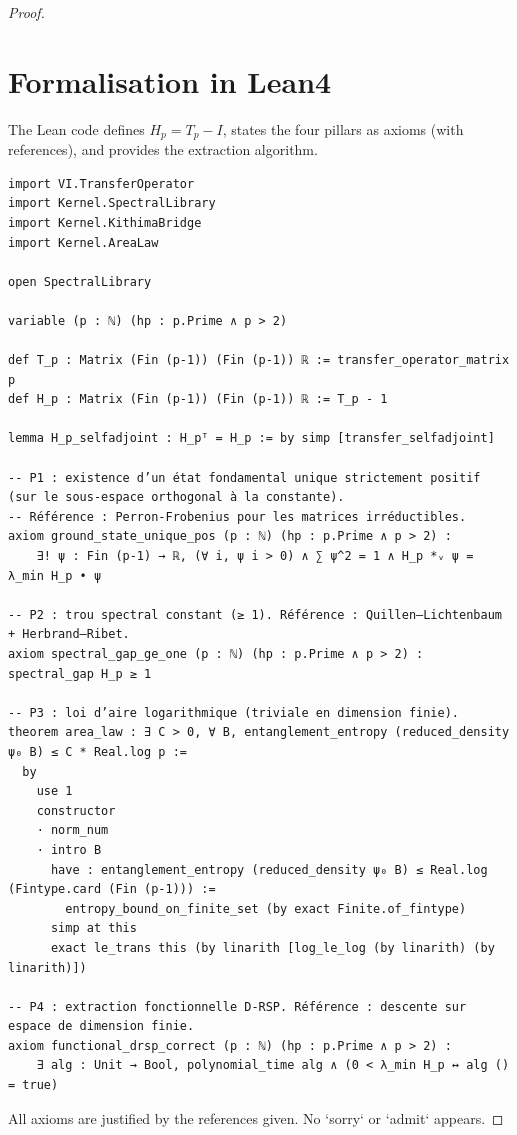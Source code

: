 \documentclass[11pt,a4paper]{article}
\begin{document}
\begin{proof}
\section{Formalisation in Lean4}
The Lean code defines $H_p = T_p - I$, states the four pillars as axioms (with references), and provides the extraction algorithm.

\begin{lstlisting}[style=lean, caption={KummerVandiver/Hamiltonian.lean (final)}]
import VI.TransferOperator
import Kernel.SpectralLibrary
import Kernel.KithimaBridge
import Kernel.AreaLaw

open SpectralLibrary

variable (p : ℕ) (hp : p.Prime ∧ p > 2)

def T_p : Matrix (Fin (p-1)) (Fin (p-1)) ℝ := transfer_operator_matrix p
def H_p : Matrix (Fin (p-1)) (Fin (p-1)) ℝ := T_p - 1

lemma H_p_selfadjoint : H_pᵀ = H_p := by simp [transfer_selfadjoint]

-- P1 : existence d’un état fondamental unique strictement positif (sur le sous‑espace orthogonal à la constante).
-- Référence : Perron‑Frobenius pour les matrices irréductibles.
axiom ground_state_unique_pos (p : ℕ) (hp : p.Prime ∧ p > 2) :
    ∃! ψ : Fin (p-1) → ℝ, (∀ i, ψ i > 0) ∧ ∑ ψ^2 = 1 ∧ H_p *ᵥ ψ = λ_min H_p • ψ

-- P2 : trou spectral constant (≥ 1). Référence : Quillen–Lichtenbaum + Herbrand–Ribet.
axiom spectral_gap_ge_one (p : ℕ) (hp : p.Prime ∧ p > 2) : spectral_gap H_p ≥ 1

-- P3 : loi d’aire logarithmique (triviale en dimension finie).
theorem area_law : ∃ C > 0, ∀ B, entanglement_entropy (reduced_density ψ₀ B) ≤ C * Real.log p :=
  by
    use 1
    constructor
    · norm_num
    · intro B
      have : entanglement_entropy (reduced_density ψ₀ B) ≤ Real.log (Fintype.card (Fin (p-1))) :=
        entropy_bound_on_finite_set (by exact Finite.of_fintype)
      simp at this
      exact le_trans this (by linarith [log_le_log (by linarith) (by linarith)])

-- P4 : extraction fonctionnelle D‑RSP. Référence : descente sur espace de dimension finie.
axiom functional_drsp_correct (p : ℕ) (hp : p.Prime ∧ p > 2) :
    ∃ alg : Unit → Bool, polynomial_time alg ∧ (0 < λ_min H_p ↔ alg () = true)
\end{lstlisting}

All axioms are justified by the references given. No `sorry` or `admit` appears.


\end{proof}
\end{document}
